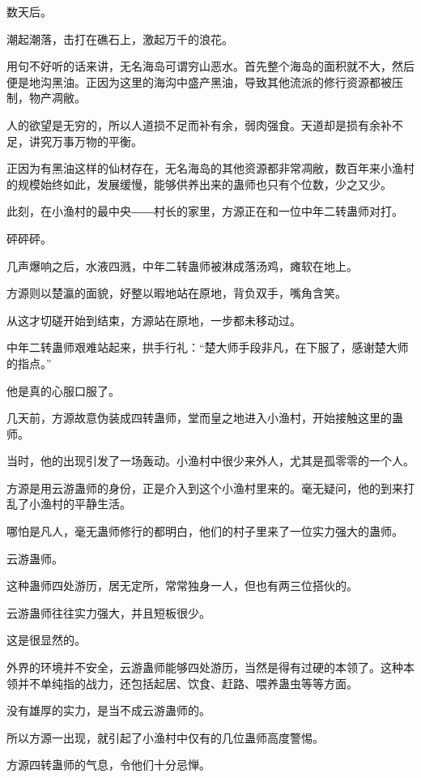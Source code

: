 
\begin{this_body}

数天后。

潮起潮落，击打在礁石上，激起万千的浪花。

用句不好听的话来讲，无名海岛可谓穷山恶水。首先整个海岛的面积就不大，然后便是地沟黑油。正因为这里的海沟中盛产黑油，导致其他流派的修行资源都被压制，物产凋敝。

人的欲望是无穷的，所以人道损不足而补有余，弱肉强食。天道却是损有余补不足，讲究万事万物的平衡。

正因为有黑油这样的仙材存在，无名海岛的其他资源都非常凋敝，数百年来小渔村的规模始终如此，发展缓慢，能够供养出来的蛊师也只有个位数，少之又少。

此刻，在小渔村的最中央――村长的家里，方源正在和一位中年二转蛊师对打。

砰砰砰。

几声爆响之后，水液四溅，中年二转蛊师被淋成落汤鸡，瘫软在地上。

方源则以楚瀛的面貌，好整以暇地站在原地，背负双手，嘴角含笑。

从这才切磋开始到结束，方源站在原地，一步都未移动过。

中年二转蛊师艰难站起来，拱手行礼：“楚大师手段非凡，在下服了，感谢楚大师的指点。”

他是真的心服口服了。

几天前，方源故意伪装成四转蛊师，堂而皇之地进入小渔村，开始接触这里的蛊师。

当时，他的出现引发了一场轰动。小渔村中很少来外人，尤其是孤零零的一个人。

方源是用云游蛊师的身份，正是介入到这个小渔村里来的。毫无疑问，他的到来打乱了小渔村的平静生活。

哪怕是凡人，毫无蛊师修行的都明白，他们的村子里来了一位实力强大的蛊师。

云游蛊师。

这种蛊师四处游历，居无定所，常常独身一人，但也有两三位搭伙的。

云游蛊师往往实力强大，并且短板很少。

这是很显然的。

外界的环境并不安全，云游蛊师能够四处游历，当然是得有过硬的本领了。这种本领并不单纯指的战力，还包括起居、饮食、赶路、喂养蛊虫等等方面。

没有雄厚的实力，是当不成云游蛊师的。

所以方源一出现，就引起了小渔村中仅有的几位蛊师高度警惕。

方源四转蛊师的气息，令他们十分忌惮。


\end{this_body}
